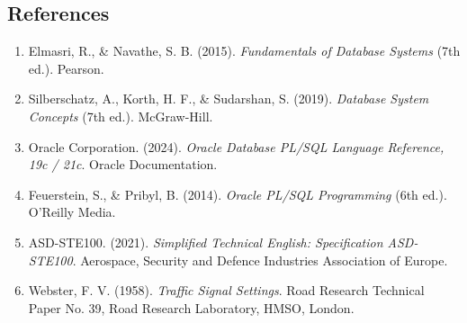 \documentclass[11pt,a4paper]{article}
\begin{document}
\subsection{References}
\begin{enumerate}
    \item Elmasri, R., \& Navathe, S. B. (2015). \textit{Fundamentals of Database Systems} (7th ed.). Pearson.
    \item Silberschatz, A., Korth, H. F., \& Sudarshan, S. (2019). \textit{Database System Concepts} (7th ed.). McGraw-Hill.
    \item Oracle Corporation. (2024). \textit{Oracle Database PL/SQL Language Reference, 19c / 21c}. Oracle Documentation.
    \item Feuerstein, S., \& Pribyl, B. (2014). \textit{Oracle PL/SQL Programming} (6th ed.). O'Reilly Media.
    \item ASD-STE100. (2021). \textit{Simplified Technical English: Specification ASD-STE100}. Aerospace, Security and Defence Industries Association of Europe.
    \item Webster, F. V. (1958). \textit{Traffic Signal Settings}. Road Research Technical Paper No. 39, Road Research Laboratory, HMSO, London.
\end{enumerate}
\end{document}
